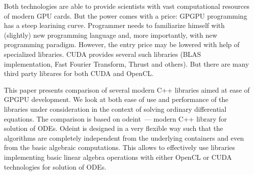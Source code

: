 \documentclass[1p]{elsarticle}
\begin{document}
Both technologies are able to provide scientists with vast computational
resources of modern GPU cards. But the power comes with a price: GPGPU
programming has a steep learining curve. Programmer needs to familiarize
himself with (slightly) new programming language and, more importantly, with
new programming paradigm. However, the entry price may be lowered with help of
specialized libraries. CUDA provides several such libraries (BLAS
implementation, Fast Fourier Transform, Thrust and others). But there are many
third party librares for both CUDA and OpenCL.

This paper presents comparison of several modern C++ libraries aimed at ease of
GPGPU development. We look at both ease of use and performance of the libraries
under consideration in the context of solving ordinary differential equations.
The comparison is based on odeint~--- modern C++ library for solution of ODEs.
Odeint is designed in a very flexible way such that the algorithms are
completely independent from the underlying containers and even from the basic
algebraic computations. This allows to effectively use libraries implementing
basic linear algebra operations with either OpenCL or CUDA technologies for
solution of ODEs.
\end{document}
